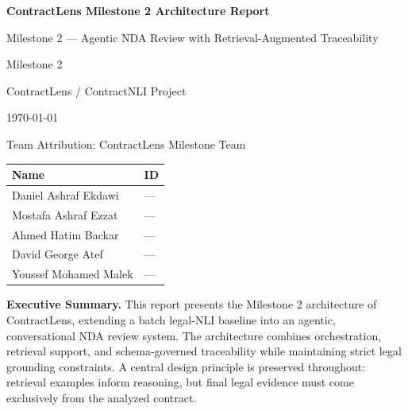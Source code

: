 \documentclass[11pt]{article}
\begin{document}
\begin{titlepage}
  \thispagestyle{empty}
  \centering
  \vspace*{2.5cm}
  {\Huge\bfseries\color{accent} ContractLens Milestone 2 Architecture Report\par}
  \vspace{0.8cm}
  {\Large Milestone 2 --- Agentic NDA Review with Retrieval-Augmented Traceability\par}
  \vspace{1.8cm}
  {\large Milestone 2\par}
  \vspace{0.5cm}
  {\large ContractLens / ContractNLI Project\par}
  \vspace{0.5cm}
  {\large \today\par}
  \vspace{1.0cm}
  {\large Team Attribution: ContractLens Milestone Team\par}
  \vspace{0.35cm}
  \begin{minipage}{0.72\textwidth}
    \centering
    \small
    \begin{tabularx}{\textwidth}{>{\raggedright\arraybackslash}X >{\raggedright\arraybackslash}p{2.2cm}}
      \toprule
      \textbf{Name} & \textbf{ID} \\
      \midrule
      Daniel Ashraf Ekdawi & — \\
      Mostafa Ashraf Ezzat & — \\
      Ahmed Hatim Backar & — \\
      David George Atef & — \\
      Youssef Mohamed Malek & — \\
      \bottomrule
    \end{tabularx}
  \end{minipage}
  \vfill
  \begin{minipage}{0.86\textwidth}
    \small
    \textbf{Executive Summary.} This report presents the Milestone 2 architecture of ContractLens, extending a batch legal-NLI baseline into an agentic, conversational NDA review system. The architecture combines orchestration, retrieval support, and schema-governed traceability while maintaining strict legal grounding constraints. A central design principle is preserved throughout: retrieval examples inform reasoning, but final legal evidence must come exclusively from the analyzed contract.
  \end{minipage}
  \vspace*{1.3cm}
\end{titlepage}
\end{document}
